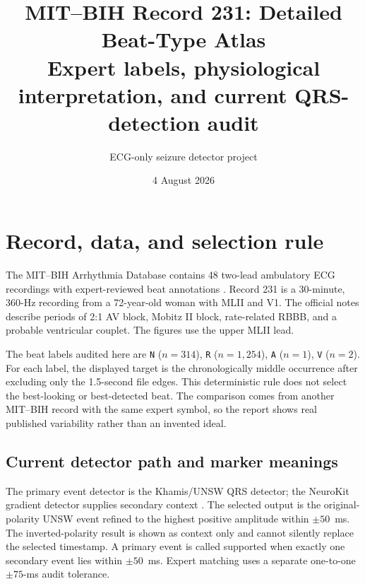 \documentclass[11pt]{article}
\title{\textbf{MIT--BIH Record 231: Detailed Beat-Type Atlas}\\[0.35em]
        \large Expert labels, physiological interpretation, and current QRS-detection audit}
\author{ECG-only seizure detector project}
\date{4 August 2026}
\begin{document}
        \maketitle

        \begin{center}
        \end{center}

        \section{Record, data, and selection rule}

        The MIT--BIH Arrhythmia Database contains 48 two-lead ambulatory ECG recordings with expert-reviewed
        beat annotations \cite{goldberger2000physiobank,moody2001mitbih,physionetmitdb}. Record 231 is
        a 30-minute, 360-Hz recording from a 72-year-old woman with MLII and V1. The official notes describe periods of 2:1 AV block, Mobitz II block, rate-related RBBB, and a probable ventricular couplet. The figures use the upper MLII lead.

        The beat labels audited here are \texttt{N} ($n=314$), \texttt{R} ($n=1,254$), \texttt{A} ($n=1$), \texttt{V} ($n=2$). For each label, the displayed target is the chronologically
        middle occurrence after excluding only the 1.5-second file edges. This deterministic rule does not
        select the best-looking or best-detected beat. The comparison comes from another MIT--BIH record with
        the same expert symbol, so the report shows real published variability rather than an invented ideal.

        \subsection{Current detector path and marker meanings}

        The primary event detector is the Khamis/UNSW QRS detector; the NeuroKit gradient detector supplies
        secondary context \cite{khamis2016telehealth,makowski2021neurokit,kristof2024qrs}. The selected
        output is the original-polarity UNSW event refined to the highest positive amplitude within $\pm50$~ms.
        The inverted-polarity result is shown as context only and cannot silently replace the selected timestamp.
        A primary event is called supported when exactly one secondary event lies within $\pm50$~ms. Expert
        matching uses a separate one-to-one $\pm75$-ms audit tolerance.
\end{document}
